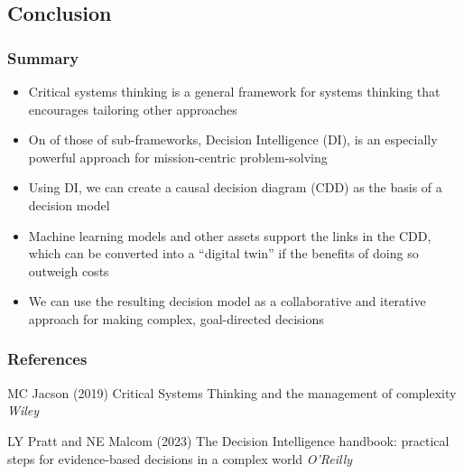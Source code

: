 \documentclass[
	11pt, %
]{beamer}
\begin{document}
\subsection{Conclusion}

\begin{frame}
    \frametitle{Summary}

    \begin{itemize}
	    \item Critical systems thinking is a general framework for systems thinking that encourages tailoring other approaches
	    \item On of those of sub-frameworks, Decision Intelligence (DI), is an especially powerful approach for mission-centric problem-solving
	    \item Using DI, we can create a causal decision diagram (CDD) as the basis of a decision model
	    \item Machine learning models and other assets support the links in the CDD, which can be converted into a ``digital twin'' if the benefits of doing so outweigh costs
	    \item We can use the resulting decision model as a collaborative and iterative approach for making complex, goal-directed decisions
    \end{itemize}
\end{frame}


\begin{frame} %
	\frametitle{References}
	
	\begin{thebibliography}{99} %
		\footnotesize %
		
			MC Jacson (2019)
			\newblock Critical Systems Thinking and the management of complexity
			\newblock \emph{Wiley}
			
			LY Pratt and NE Malcom (2023)
			\newblock The Decision Intelligence handbook: practical steps for evidence-based decisions in a complex world
			\newblock \emph{O'Reilly}
	\end{thebibliography}
\end{frame}
\end{document}
